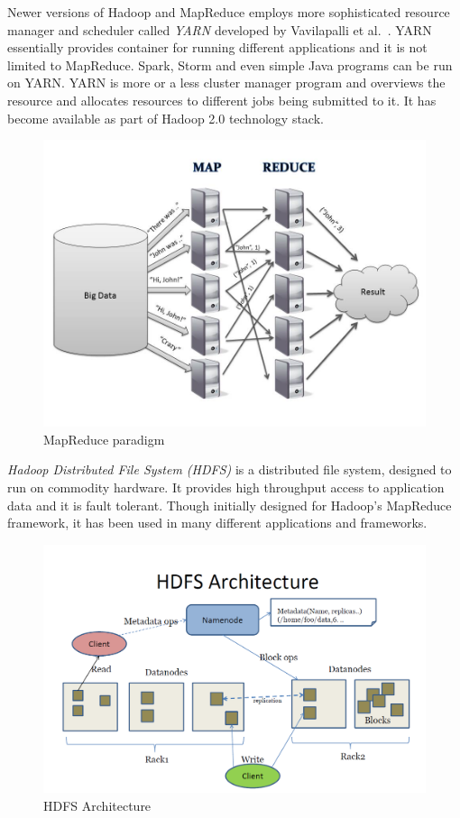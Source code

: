 \documentclass[english]{tktltiki}
\begin{document}
Newer versions of Hadoop and MapReduce employs more sophisticated resource manager and scheduler called \textit{YARN} developed by Vavilapalli et al.\ \cite{vavila13}. 
YARN essentially provides container for running different applications and it is not limited to MapReduce. 
Spark, Storm and even simple Java programs can be run on YARN. 
YARN is more or a less cluster manager program and overviews the resource and allocates resources to different jobs being submitted to it. 
It has become available as part of Hadoop 2.0 technology stack.
\begin{figure}[ht!]
\centering
\includegraphics[width=150mm]{figures/mapreduce.jpg}
\caption[]{MapReduce paradigm \footnotemark}

\label{fig:mapreducepara}
\end{figure}

\textit{Hadoop Distributed File System (HDFS)} is a distributed file system, designed to run on commodity hardware. 
It provides high throughput access to application data and it is fault tolerant. 
Though initially designed for Hadoop's MapReduce framework, it has been used in many different applications and frameworks.
\begin{figure}[ht!]
\centering
\includegraphics[width=150mm]{figures/hdfsarchitecture.png}
\caption[]{HDFS Architecture \protect \footnotemark}
\label{fig:hdfsarch}
\end{figure}
\end{document}
